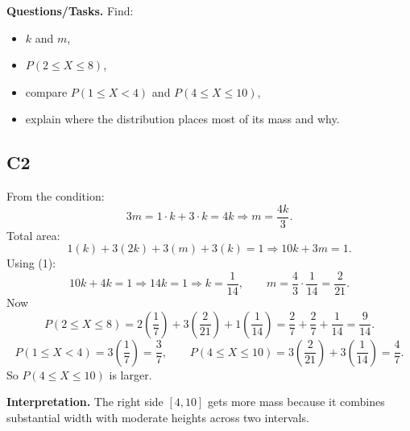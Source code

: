\textbf{Questions/Tasks.}
Find:
\begin{itemize}
    \item[(a)] $k$ and $m$,
    \item[(b)] $P(2\le X\le 8)$,
    \item[(c)] compare $P(1\le X<4)$ and $P(4\le X\le 10)$,
    \item[(d)] explain where the distribution places most of its mass and why.
\end{itemize}

\subsection*{C2}
From the condition:
\[
3m=1\cdot k+3\cdot k=4k
\Rightarrow m=\frac{4k}{3}. \tag{1}
\]
Total area:
\[
1(k)+3(2k)+3(m)+3(k)=1
\Rightarrow 10k+3m=1.
\]
Using (1):
\[
10k+4k=1 \Rightarrow 14k=1 \Rightarrow k=\frac{1}{14},
\qquad
m=\frac{4}{3}\cdot\frac{1}{14}=\frac{2}{21}.
\]
Now
\[
P(2\le X\le 8)=2\left(\frac{1}{7}\right)+3\left(\frac{2}{21}\right)+1\left(\frac{1}{14}\right)
=\frac{2}{7}+\frac{2}{7}+\frac{1}{14}=\frac{9}{14}.
\]
\[
P(1\le X<4)=3\left(\frac{1}{7}\right)=\frac{3}{7},
\qquad
P(4\le X\le 10)=3\left(\frac{2}{21}\right)+3\left(\frac{1}{14}\right)=\frac{4}{7}.
\]
So $P(4\le X\le 10)$ is larger.

\textbf{Interpretation.}
The right side $[4,10]$ gets more mass because it combines substantial width with moderate heights across two intervals.


